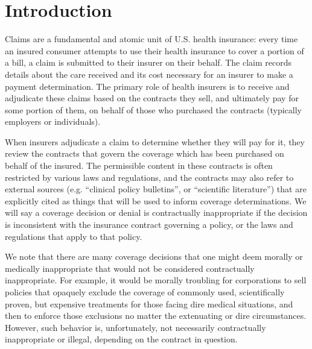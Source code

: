 \documentclass[12pt, a4paper,twoside,parskip=full]{report}
\theoremstyle{plain} %
\theoremstyle{definition} %
\theoremstyle{remark} %
\numberwithin{equation}{chapter}
\begin{document}
		\tableofcontents
		
		
		
		\chapter{Introduction}\label{intro}
		
		Claims are a fundamental and atomic unit of U.S. health insurance: every time an insured consumer attempts to use their health insurance to cover a portion of a bill, a claim is submitted to their insurer on their behalf. The claim records details about the care received and its cost necessary for an insurer to make a payment determination. The primary role of health insurers is to receive and adjudicate these claims based on the contracts they sell, and ultimately pay for some portion of them, on behalf of those who purchased the contracts (typically employers or individuals).
		
		When insurers adjudicate a claim to determine whether they will pay for it, they review the contracts that govern the coverage which has been purchased on behalf of the insured. The permissible content in these contracts is often restricted by various laws and regulations, and the contracts may also refer to external sources (e.g. ``clinical policy bulletins'', or ``scientific literature'') that are explicitly cited as things that will be used to inform coverage determinations. We will say a coverage decision or denial is contractually inappropriate if the decision is inconsistent with the insurance contract governing a policy, or the laws and regulations that apply to that policy.
		
		We note that there are many coverage decisions that one might deem morally or medically inappropriate that would not be considered contractually inappropriate. For example, it would be morally troubling for corporations to sell policies that opaquely exclude the coverage of commonly used, scientifically proven, but expensive treatments for those facing dire medical situations, and then to enforce those exclusions no matter the extenuating or dire circumstances. However, such behavior is, unfortunately, not necessarily contractually inappropriate or illegal, depending on the contract in question.
		
\end{document}
